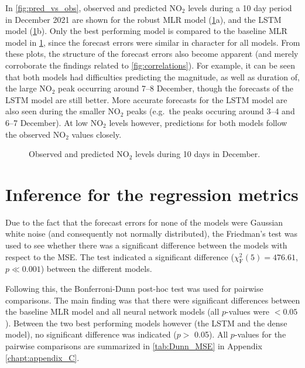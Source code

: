 \noindent
In \vref{fig:pred_vs_obs}, observed and predicted NO$_2$ levels during a 10 day period in December 2021 are shown for the robust MLR model (\cref{fig:pred_vs_obs}a), and the LSTM model (\cref{fig:pred_vs_obs}b). Only the best performing model is compared to the baseline MLR model in \cref{fig:pred_vs_obs}, since the forecast errors were similar in character for all models. From these plots, the structure of the forecast errors also become apparent (and merely corroborate the findings related to \cref{fig:correlations}). For example, it can be seen that both models had difficulties predicting the magnitude, as well as duration of, the large NO$_2$ peak occurring around 7--8 December, though the forecasts of the LSTM model are still better. More accurate forecasts for the LSTM model are also seen during the smaller NO$_2$ peaks (e.g.\ the peaks occuring around 3--4 and 6--7 December). At low NO$_2$ levels however, predictions for both models follow the observed NO$_2$ values closely. 


\begin{figure}[h] 
\begin{center}
\caption{Observed and predicted NO$_2$ levels during 10 days in December.}
\label{fig:pred_vs_obs}
\end{center}
\end{figure}

\section{Inference for the regression metrics}
\label{sec:inference}

Due to the fact that the forecast errors for none of the models were Gaussian white noise (and consequently not normally distributed), the Friedman's test was used to see whether there was a significant difference between the models with respect to the MSE. The test indicated a significant difference ($\chi^2_{\text{F}}(5) = 476.61$, $p\ll0.001$) between the different models. 

Following this, the Bonferroni-Dunn post-hoc test was used for pairwise comparisons. The main finding was that there were significant differences between the baseline MLR model and all neural network models (all $p$-values were $<0.05$). Between the two best performing models however (the LSTM and the dense model), no significant difference was indicated ($p> $ 0.05). 
All $p$-values for the pairwise comparisons are summarized in \cref{tab:Dunn_MSE} in Appendix \ref{chapt:appendix_C}. 


